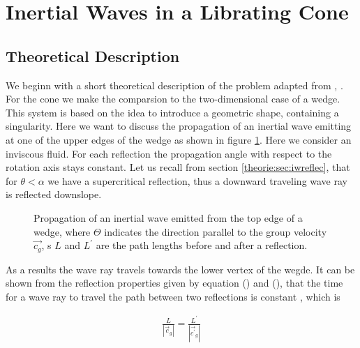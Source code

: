 \section{Inertial Waves in a Librating Cone}
\label{cone:theorie_exp}

\subsection{Theoretical Description}

We beginn with a short theoretical description of the problem adapted from \citep{Greenspan1969}, \citep{Beardsley1970}.
For the cone we make the comparsion to the two-dimensional case of a wedge.
This system is based on the idea to introduce a geometric shape, containing a singularity.
Here we want to discuss the propagation of an inertial wave emitting at one of the upper edges of
the wedge as shown in figure \ref{cone:theorie}.
Here we consider an inviscous fluid.
For each reflection the propagation angle with respect to the rotation axis stays constant.
Let us recall from  section \ref{theorie:sec:iwreflec}, that
for $\theta<\alpha$ we have a supercritical reflection,
thus a downward traveling wave ray is reflected downslope.

\begin{figure}[!tp]
  \begin{minipage}[c]{0.6\textwidth}
      \centering
  \end{minipage}
  \begin{minipage}[c]{0.3\textwidth}
      \caption{
          Propagation of an inertial wave emitted from the top edge of a wedge,
           where $\Theta$ indicates the direction parallel to the group velocity
            $\vec{c_g}$, s $L$ and $L^{\prime}$ are the path lengths before and after a reflection.
      \label{cone:theorie}
      }
  \end{minipage}
\end{figure}

As a results the wave ray travels towards the lower vertex of the wegde.
It can be shown from the reflection properties given by equation () and (),
that the time for a wave ray to travel the path between two reflections is constant \citep{Beardsley1970},
which is

\begin{align}
    \frac{L}{|\vec{c}_g|} = \frac{L^{\prime}}{|\vec{c^{\prime}}_g|}
\end{align}

